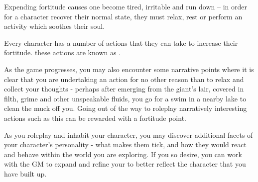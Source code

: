 Expending fortitude causes one become tired, irritable and run down -- in order for a character recover their normal state, they must relax, rest or perform an activity which soothes their soul. 

Every character has a number of actions that they can take to increase their fortitude. these actions are known as .

\begin{itemize}
\end{itemize}

As the game progresses, you may also encounter some narrative points where it is clear that you are undertaking an action for no other reason than to relax and collect your thoughts - perhaps after emerging from the giant's lair, covered in filth, grime and other unspeakable fluids, you go for a swim in a nearby lake to clean the muck off you. Going out of the way to roleplay narratively interesting actions such as this can be rewarded with a fortitude point. 

As you roleplay and inhabit your character, you may discover additional facets of your character's personality - what makes them tick, and how they would react and behave within the world you are exploring. If you so desire, you can work with the GM to expand and refine your  to better reflect the character that you have built up. 

